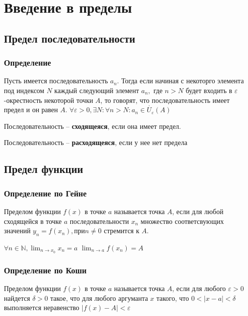 \chapter{Введение в пределы}
\section{Предел последовательности}
\subsection{Определение}
Пусть имеется последовательность $a_n$. Тогда если начиная с некоторго элемента под индексом $N$ каждый следующий элемент $a_n,$ где $n>N$ будет входить в $\varepsilon$-окрестность некоторой точки $A$, то говорят, что последовательность имеет предел и он равен $A$. \newline
$\forall \varepsilon > 0, \exists N : \forall n > N: a_n \in \mathring{U_\varepsilon}(A)$
\begin{mydef}Последовательность -- \textbf{сходящеяся}, если она имеет предел.\end{mydef}
\begin{mydef}Последовательность -- \textbf{расходящеяся}, если у нее нет предела\end{mydef}

\section{Предел функции}
\subsection{Определение по Гейне}
Пределом функции $f(x)$ в точке $a$ называется точка $A$, если для любой сходящейся в точке $a$ последовательности $x_n$ множество соответсвующих значений $y_n = f(x_n), при n \neq 0$ стремится к $A$.\newline

$\displaystyle \forall n \in \mathbb{N}, \lim_{n \to x_0} x_n = a$ \newline
$\displaystyle \lim_{n \to a} f(x_n) = A$

\subsection{Определение по Коши}
Пределом функции $f(x)$ в точке $a$ называется точка $A$, если для любого $\varepsilon > 0$ найдется $\delta > 0$ такое, что для любого аргуманта $x$ такого, что $0 < |x - a| < \delta$ выполняется неравенство $|f(x) - A| < \varepsilon$ \newline

